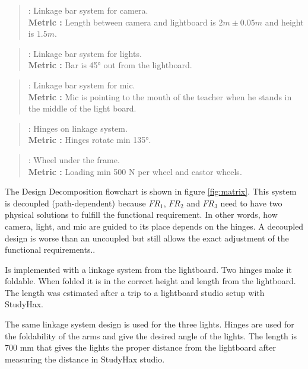\documentclass[a4paper]{jpconf}
\begin{document}
	\begin{quote} 
		\textbf{} : Linkage bar system for camera. \\ 
		\textbf{Metric :} Length between camera and lightboard is $2 m \pm 0.05 m$ and height is $1.5 m$.
	\end{quote}
	
	\begin{quote} 
		\textbf{} : Linkage bar system for lights.
		\\ \textbf{Metric :} Bar is 45° out from the lightboard.
	\end{quote}
	
	\begin{quote} 
		\textbf{} : Linkage bar system for mic.
		\\ \textbf{Metric :} Mic is pointing to the mouth of the teacher when he stands in the middle of the light board.
	\end{quote}
	
	\begin{quote} 
		\textbf{} : Hinges on linkage system.
		\\ \textbf{Metric :} Hinges rotate min 135°.
	\end{quote}
	
	\begin{quote} 
		\textbf{} : Wheel under the frame.
		\\ \textbf{Metric :} Loading min 500 N per wheel and castor wheels.
	\end{quote}
	
	The Design Decomposition flowchart is shown in figure \ref{fig:matrix}.
	This system is decoupled (path-dependent) because $FR_1$, $FR_2$ and $FR_3$ need to have two physical solutions to fulfill the functional requirement.
	In other words, how camera, light, and mic are guided to its place depends on the hinges.
	A decoupled design is worse than an uncoupled but still allows the exact adjustment of the functional requirements.\cite{system_design}.
	
	
	\textbf{} Is implemented with a linkage system from the lightboard.
	Two hinges make it foldable.
	When folded it is in the correct height and length from the lightboard.
	The length was estimated after a trip to a lightboard studio setup with StudyHax.
	
	\textbf{} The same linkage system design is used for the three lights.
	Hinges are used for the foldability of the arms and give the desired angle of the lights.
	The length is 700 mm that gives the lights the proper distance from the lightboard after measuring the distance in StudyHax studio.
	
\end{document}
